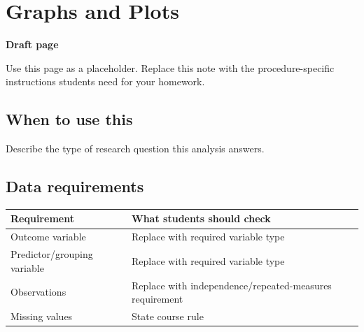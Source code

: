 \documentclass[
  letterpaper,
  DIV=11,
  numbers=noendperiod]{scrreprt}
\newcounter{none} %
\begin{document}
\chapter{Graphs and Plots}\label{graphs-and-plots}

\begin{tcolorbox}[enhanced jigsaw, arc=.35mm, bottomrule=.15mm, breakable, colback=white, colframe=quarto-callout-note-color-frame, left=2mm, leftrule=.75mm, opacityback=0, rightrule=.15mm, toprule=.15mm]
\begin{minipage}[t]{5.5mm}
\textcolor{quarto-callout-note-color}{\faInfo}
\end{minipage}%
\begin{minipage}[t]{\textwidth - 5.5mm}

\vspace{-3mm}\textbf{Draft page}\vspace{3mm}

Use this page as a placeholder. Replace this note with the
procedure-specific instructions students need for your homework.

\end{minipage}%
\end{tcolorbox}

\section{When to use this}\label{when-to-use-this-4}

Describe the type of research question this analysis answers.

\section{Data requirements}\label{data-requirements-4}

{\def\LTcaptype{none} %
\begin{longtable}[]{@{}
  >{\raggedright\arraybackslash}p{}
  >{\raggedright\arraybackslash}p{}@{}}
\toprule\noalign{}
\begin{minipage}[b]{\linewidth}\raggedright
Requirement
\end{minipage} & \begin{minipage}[b]{\linewidth}\raggedright
What students should check
\end{minipage} \\
\midrule\noalign{}
\endhead
\bottomrule\noalign{}
\endlastfoot
Outcome variable & Replace with required variable type \\
Predictor/grouping variable & Replace with required variable type \\
Observations & Replace with independence/repeated-measures
requirement \\
Missing values & State course rule \\
\end{longtable}
}
\end{document}

